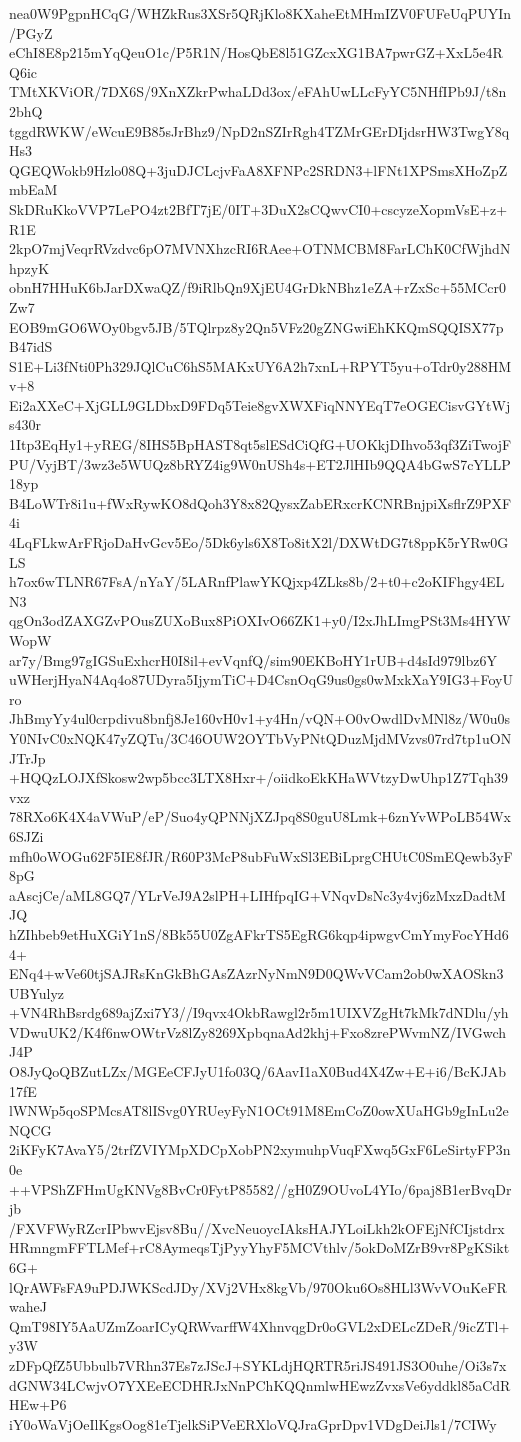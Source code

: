 nea0W9PgpnHCqG/WHZkRus3XSr5QRjKlo8KXaheEtMHmIZV0FUFeUqPUYIn/PGyZ
eChI8E8p215mYqQeuO1c/P5R1N/HosQbE8l51GZcxXG1BA7pwrGZ+XxL5e4RQ6ic
TMtXKViOR/7DX6S/9XnXZkrPwhaLDd3ox/eFAhUwLLcFyYC5NHfIPb9J/t8n2bhQ
tggdRWKW/eWcuE9B85sJrBhz9/NpD2nSZIrRgh4TZMrGErDIjdsrHW3TwgY8qHs3
QGEQWokb9Hzlo08Q+3juDJCLcjvFaA8XFNPc2SRDN3+lFNt1XPSmsXHoZpZmbEaM
SkDRuKkoVVP7LePO4zt2BfT7jE/0IT+3DuX2sCQwvCI0+cscyzeXopmVsE+z+R1E
2kpO7mjVeqrRVzdvc6pO7MVNXhzcRI6RAee+OTNMCBM8FarLChK0CfWjhdNhpzyK
obnH7HHuK6bJarDXwaQZ/f9iRlbQn9XjEU4GrDkNBhz1eZA+rZxSc+55MCcr0Zw7
EOB9mGO6WOy0bgv5JB/5TQlrpz8y2Qn5VFz20gZNGwiEhKKQmSQQISX77pB47idS
S1E+Li3fNti0Ph329JQlCuC6hS5MAKxUY6A2h7xnL+RPYT5yu+oTdr0y288HMv+8
Ei2aXXeC+XjGLL9GLDbxD9FDq5Teie8gvXWXFiqNNYEqT7eOGECisvGYtWjs430r
1Itp3EqHy1+yREG/8IHS5BpHAST8qt5slESdCiQfG+UOKkjDIhvo53qf3ZiTwojF
PU/VyjBT/3wz3e5WUQz8bRYZ4ig9W0nUSh4s+ET2JlHIb9QQA4bGwS7cYLLP18yp
B4LoWTr8i1u+fWxRywKO8dQoh3Y8x82QysxZabERxcrKCNRBnjpiXsflrZ9PXF4i
4LqFLkwArFRjoDaHvGcv5Eo/5Dk6yls6X8To8itX2l/DXWtDG7t8ppK5rYRw0GLS
h7ox6wTLNR67FsA/nYaY/5LARnfPlawYKQjxp4ZLks8b/2+t0+c2oKIFhgy4ELN3
qgOn3odZAXGZvPOusZUXoBux8PiOXIvO66ZK1+y0/I2xJhLImgPSt3Ms4HYWWopW
ar7y/Bmg97gIGSuExhcrH0I8il+evVqnfQ/sim90EKBoHY1rUB+d4sId979lbz6Y
uWHerjHyaN4Aq4o87UDyra5IjymTiC+D4CsnOqG9us0gs0wMxkXaY9IG3+FoyUro
JhBmyYy4ul0crpdivu8bnfj8Je160vH0v1+y4Hn/vQN+O0vOwdlDvMNl8z/W0u0s
Y0NIvC0xNQK47yZQTu/3C46OUW2OYTbVyPNtQDuzMjdMVzvs07rd7tp1uONJTrJp
+HQQzLOJXfSkosw2wp5bcc3LTX8Hxr+/oiidkoEkKHaWVtzyDwUhp1Z7Tqh39vxz
78RXo6K4X4aVWuP/eP/Suo4yQPNNjXZJpq8S0guU8Lmk+6znYvWPoLB54Wx6SJZi
mfh0oWOGu62F5IE8fJR/R60P3McP8ubFuWxSl3EBiLprgCHUtC0SmEQewb3yF8pG
aAscjCe/aML8GQ7/YLrVeJ9A2slPH+LIHfpqIG+VNqvDsNc3y4vj6zMxzDadtMJQ
hZIhbeb9etHuXGiY1nS/8Bk55U0ZgAFkrTS5EgRG6kqp4ipwgvCmYmyFocYHd64+
ENq4+wVe60tjSAJRsKnGkBhGAsZAzrNyNmN9D0QWvVCam2ob0wXAOSkn3UBYulyz
+VN4RhBsrdg689ajZxi7Y3//I9qvx4OkbRawgl2r5m1UIXVZgHt7kMk7dNDlu/yh
VDwuUK2/K4f6nwOWtrVz8lZy8269XpbqnaAd2khj+Fxo8zrePWvmNZ/IVGwchJ4P
O8JyQoQBZutLZx/MGEeCFJyU1fo03Q/6AavI1aX0Bud4X4Zw+E+i6/BcKJAb17fE
lWNWp5qoSPMcsAT8lISvg0YRUeyFyN1OCt91M8EmCoZ0owXUaHGb9gInLu2eNQCG
2iKFyK7AvaY5/2trfZVIYMpXDCpXobPN2xymuhpVuqFXwq5GxF6LeSirtyFP3n0e
++VPShZFHmUgKNVg8BvCr0FytP85582//gH0Z9OUvoL4YIo/6paj8B1erBvqDrjb
/FXVFWyRZcrIPbwvEjsv8Bu//XvcNeuoycIAksHAJYLoiLkh2kOFEjNfCIjstdrx
HRmngmFFTLMef+rC8AymeqsTjPyyYhyF5MCVthlv/5okDoMZrB9vr8PgKSikt6G+
lQrAWFsFA9uPDJWKScdJDy/XVj2VHx8kgVb/970Oku6Os8HLl3WvVOuKeFRwaheJ
QmT98IY5AaUZmZoarICyQRWvarffW4XhnvqgDr0oGVL2xDELcZDeR/9icZTl+y3W
zDFpQfZ5Ubbulb7VRhn37Es7zJScJ+SYKLdjHQRTR5riJS491JS3O0uhe/Oi3s7x
dGNW34LCwjvO7YXEeECDHRJxNnPChKQQnmlwHEwzZvxsVe6yddkl85aCdRHEw+P6
iY0oWaVjOeIlKgsOog81eTjelkSiPVeERXloVQJraGprDpv1VDgDeiJls1/7CIWy
